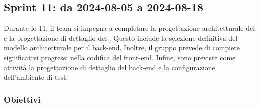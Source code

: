 \subsection{Sprint 11: da 2024-08-05 a 2024-08-18}
\par Durante lo  11, il team si impegna a completare la progettazione architetturale del  e la progettazione di dettaglio del . Questo include la selezione definitiva del modello architetturale per il back-end. Inoltre, il gruppo prevede di compiere significativi progressi nella codifica del front-end. Infine, sono previste come attività la progettazione di dettaglio del back-end e la configurazione dell'ambiente di test.

\subsubsection{Obiettivi}
